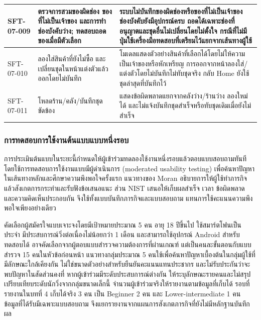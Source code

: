 \begin{longtable}{|>{\raggedright\arraybackslash}p{}|>{\raggedright\arraybackslash}p{}|>{\raggedright\arraybackslash}p{}|}
SFT-07-009 & ตรวจการสวมของผิดช่อง ของที่ไม่เป็นเจ้าของ และการทำช่องบังคับว่าง; ทดสอบถอดของเมื่อมีตัวเลือก & ระบบไม่บันทึกของผิดช่องหรือของที่ไม่เป็นเจ้าของ ช่องบังคับยังมีอุปกรณ์ครบ ถอดได้เฉพาะช่องที่อนุญาตและชุดอื่นไม่เปลี่ยนโดยไม่ตั้งใจ กรณีที่ไม่มีปุ่มใช้เครื่องมือทดสอบที่เตรียมไว้แยกจากเส้นทางผู้ใช้ \\ \hline
SFT-07-010 & ลองใส่สินค้าที่ยังไม่ซื้อ และเปลี่ยนชุดในหน้าแต่งตัวแล้วออกโดยไม่บันทึก & โมเดลแสดงตัวอย่างสินค้าที่เลือกได้โดยไม่ให้ความเป็นเจ้าของหรือหักเหรียญ การออกจากหน้าลองใส่/แต่งตัวโดยไม่บันทึกไม่ทับชุดจริง กลับ Home ยังใช้ชุดล่าสุดที่บันทึกไว้ \\ \hline
SFT-07-011 & โหลดร้าน/คลัง/บันทึกชุดขัดข้อง & แสดงข้อผิดพลาดแยกจากคลังว่าง/ร้านว่าง ลองใหม่ได้ และไม่แจ้งบันทึกชุดสำเร็จหรือทับชุดเดิมเมื่อยังไม่สำเร็จ \\ \hline
\end{longtable}
\endgroup

\subsubsection{การทดสอบการใช้งานต้นแบบแบบหนึ่งรอบ}
\label{sec:single-session-protocol}

การประเมินต้นแบบในระยะนี้กำหนดให้ผู้เข้าร่วมทดลองใช้งานหนึ่งรอบแล้วตอบแบบสอบถามทันที โดยใช้การทดสอบการใช้งานแบบมีผู้ดำเนินการ (moderated usability testing) เพื่อค้นหาปัญหาในเส้นทางหลักและศึกษาความพึงพอใจครั้งแรก แนวทางของ Moran \cite{moran2019usability} อธิบายการให้ผู้ใช้ทำภารกิจแล้วสังเกตการกระทำและรับฟังข้อเสนอแนะ ส่วน NIST \cite{nistUsabilityTesting} เสนอให้เก็บผลสำเร็จ เวลา ข้อผิดพลาด และความคิดเห็นประกอบกัน จึงใช้ทั้งแบบบันทึกภารกิจและแบบสอบถาม แทนการใช้คะแนนความพึงพอใจเพียงอย่างเดียว

คัดเลือกผู้สมัครใจแบบเจาะจงโดยมีเป้าหมายประมาณ 5 คน อายุ 18 ปีขึ้นไป ใช้สมาร์ตโฟนเป็นประจำ มีประสบการณ์วิ่งต่อเนื่องไม่น้อยกว่า 1 เดือน และสามารถใช้อุปกรณ์ Android สำหรับทดสอบได้ อาจคัดเลือกจากผู้ตอบแบบสำรวจความต้องการที่ผ่านเกณฑ์ แต่เป็นคนละขั้นตอนกับแบบสำรวจ 15 คนในหัวข้อก่อนหน้า แนวทางกลุ่มประมาณ 5 คนใช้เพื่อค้นหาปัญหาเบื้องต้นในกลุ่มผู้ใช้ที่มีลักษณะใกล้เคียงกัน ไม่ใช่ขนาดตัวอย่างสำหรับยืนยันคะแนนแทนประชากร และไม่รับประกันว่าจะพบปัญหาในสัดส่วนคงที่ \cite{budiu2021five} หากผู้เข้าร่วมมีระดับประสบการณ์ต่างกัน ให้ระบุลักษณะรายคนและไม่สรุปเปรียบเทียบระดับนักวิ่งจากกลุ่มขนาดเล็กนี้ จำนวนผู้เข้าร่วมจริงให้รายงานตามข้อมูลที่เก็บได้ รอบที่รายงานในบทที่ 4 เก็บได้จริง 3 คน เป็น Beginner 2 คน และ Lower-intermediate 1 คน ข้อมูลที่ได้รับมีเฉพาะแบบสอบถาม จึงแยกรายงานจากแผนการสังเกตภารกิจที่ยังไม่มีหลักฐานบันทึกผล

